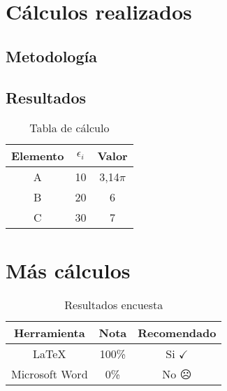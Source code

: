 \newpage
\begin{anexo}
	\section{Cálculos realizados}

		\subsection{Metodología}
			\lipsum[1]
			
		
		\subsection{Resultados}
			\lipsum[10]
			
			\begin{table}[htbp]
				\centering
				\caption{Tabla de cálculo}
				\begin{tabular}{ccc}
					\hline
					\textbf{Elemento} & $\epsilon_i$ & \boldmath{}\textbf{Valor}\unboldmath{} \bigstrut\\
					\hline
					A     & 10    & 3,14$\pi$ \bigstrut[t]\\
					B     & 20    & 6 \\
					C     & 30    & 7 \\
					\end{tabular}
				\label{tab:anexo-1}
			\end{table}
	
	\newpage
	\section{Más cálculos}
	
		\lipsum[1]
		
		\newp \lipsum[4]
		
		\begin{table}[htbp]
			\centering
			\caption{Resultados encuesta}
			\begin{tabular}{ccc}
				\hline
				\textbf{Herramienta} & \textbf{Nota} & \textbf{Recomendado} \bigstrut\\
				\hline
				\LaTeX & 100\% & Si $\checkmark$ \\
				Microsoft Word \textsuperscript{\textregistered} & 0\%   & No $\frownie$\\
			\end{tabular}
			\label{tab:anexo-2}
		\end{table}
	
\end{anexo}
